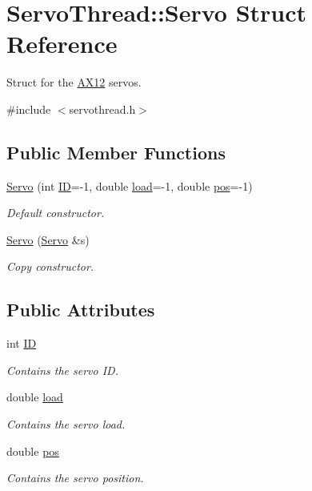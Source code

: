 \hypertarget{struct_servo_thread_1_1_servo}{}\section{Servo\+Thread\+:\+:Servo Struct Reference}
\label{struct_servo_thread_1_1_servo}


Struct for the \hyperlink{class_a_x12}{A\+X12} servos.  




{\ttfamily \#include $<$servothread.\+h$>$}

\subsection*{Public Member Functions}
\begin{DoxyCompactItemize}
\item 
\hyperlink{struct_servo_thread_1_1_servo_a031c8e78df1e5eddf80bd2b2e2998658}{Servo} (int \hyperlink{struct_servo_thread_1_1_servo_a06b514c42113aa85fd1703fc88fca7ce}{I\+D}=-\/1, double \hyperlink{struct_servo_thread_1_1_servo_ae378d77acf16b306649c87fdb8df677e}{load}=-\/1, double \hyperlink{struct_servo_thread_1_1_servo_a9fa0aa56944b9b0bb9d66303d5bd4b59}{pos}=-\/1)
\begin{DoxyCompactList}\small\item\em Default constructor. \end{DoxyCompactList}\item 
\hyperlink{struct_servo_thread_1_1_servo_ad5caa6903df672ae7a5ac0f3fb301e23}{Servo} (\hyperlink{struct_servo_thread_1_1_servo}{Servo} \&s)
\begin{DoxyCompactList}\small\item\em Copy constructor. \end{DoxyCompactList}\end{DoxyCompactItemize}
\subsection*{Public Attributes}
\begin{DoxyCompactItemize}
\item 
int \hyperlink{struct_servo_thread_1_1_servo_a06b514c42113aa85fd1703fc88fca7ce}{I\+D}
\begin{DoxyCompactList}\small\item\em Contains the servo I\+D. \end{DoxyCompactList}\item 
double \hyperlink{struct_servo_thread_1_1_servo_ae378d77acf16b306649c87fdb8df677e}{load}
\begin{DoxyCompactList}\small\item\em Contains the servo load. \end{DoxyCompactList}\item 
double \hyperlink{struct_servo_thread_1_1_servo_a9fa0aa56944b9b0bb9d66303d5bd4b59}{pos}
\begin{DoxyCompactList}\small\item\em Contains the servo position. \end{DoxyCompactList}\end{DoxyCompactItemize}


